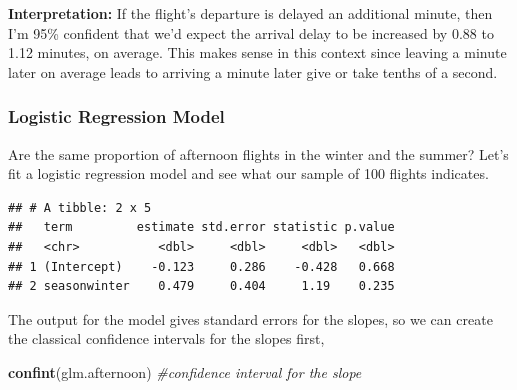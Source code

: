 \documentclass[
]{book}
\newenvironment{Shaded}{\begin{snugshade}}{\end{snugshade}}
\newcommand{\AttributeTok}[1]{\textcolor[rgb]{0.13,0.29,0.53}{#1}}
\newcommand{\CommentTok}[1]{\textcolor[rgb]{0.56,0.35,0.01}{\textit{#1}}}
\newcommand{\FunctionTok}[1]{\textcolor[rgb]{0.13,0.29,0.53}{\textbf{#1}}}
\newcommand{\NormalTok}[1]{#1}
\newcommand{\OtherTok}[1]{\textcolor[rgb]{0.56,0.35,0.01}{#1}}
\newcommand{\SpecialCharTok}[1]{\textcolor[rgb]{0.81,0.36,0.00}{\textbf{#1}}}
\newcommand{\StringTok}[1]{\textcolor[rgb]{0.31,0.60,0.02}{#1}}
\begin{document}
\textbf{Interpretation:} If the flight's departure is delayed an additional minute, then I'm 95\% confident that we'd expect the arrival delay to be increased by 0.88 to 1.12 minutes, on average. This makes sense in this context since leaving a minute later on average leads to arriving a minute later give or take tenths of a second.

\subsubsection{Logistic Regression Model}\label{logistic-regression-model}

Are the same proportion of afternoon flights in the winter and the summer? Let's fit a logistic regression model and see what our sample of 100 flights indicates.

\begin{Shaded}
\end{Shaded}

\begin{verbatim}
## # A tibble: 2 x 5
##   term         estimate std.error statistic p.value
##   <chr>           <dbl>     <dbl>     <dbl>   <dbl>
## 1 (Intercept)    -0.123     0.286    -0.428   0.668
## 2 seasonwinter    0.479     0.404     1.19    0.235
\end{verbatim}

The output for the model gives standard errors for the slopes, so we can create the classical confidence intervals for the slopes first,

\begin{Shaded}
\begin{Highlighting}[]
\FunctionTok{confint}\NormalTok{(glm.afternoon) }\CommentTok{\#confidence interval for the slope}
\end{Highlighting}
\end{Shaded}
\end{document}
